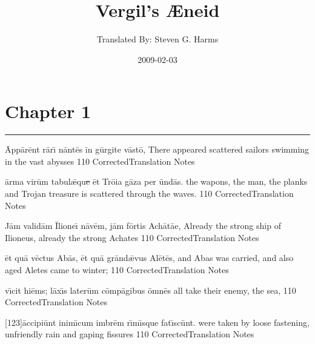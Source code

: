 \documentclass[]{book}
\title{Vergil's {\AE}neid}
\author{ Translated By:  Steven G. Harms }
\date{2009-02-03}
\begin{document}

\ifpdf
{}
\else
{}
\fi

\enumstyle 

\maketitle
\tableofcontents

\chapter{Chapter 1}
%
%
%
%

\newpage

\rule{7cm}{.5mm}

	\latline
	  {\=App\={\macron a}r\=ent r\={\macron a}r\={\macron \i} n\=ant\={\macron e}s \=in g\=urg\-it\-e v\=ast\={\macron o},}
	  { There appeared scattered sailors swimming in the vast abysses }
	  {110}
	  { CorrectedTranslation }
	  { Notes }



	\latline
	  {\=arm\-a v\-ir\=um t\-ab\-ul\={\ae}qu\sout{e }\=et Tr\={\macron o}\-i\-a g\=az\-a p\-er \=und\={\macron a}s.}
	  { the wapons, the man, the planks and Trojan treasure is scattered through the waves. }
	  {110}
	  { CorrectedTranslation }
	  { Notes }


	\latline
	  {J\=am v\-al\-id\=am \={\macron I}lione\={\macron \i} n\={\macron a}v\=em, j\=am f\=ort\-is \-Ach\={\macron a}t\={ae},}
	  { Already the strong ship of Ilioneus, already the strong Achates }
	  {110}
	  { CorrectedTranslation }
	  { Notes }

\newpage

	\latline
	  {\=et qu\={\macron a} v\=ect\-us \-Ab\={\macron a}s, \=et qu\={\macron a} gr\=and\={\ae}v\-us \-Al\={\macron e}t\={\macron e}s,}
	  { and Abas was carried, and also aged Aletes came to winter;  }
	  {110}
	  { CorrectedTranslation }
	  { Notes }



	\latline
	  {v\={\macron \i}c\-it h\-i\=ems; l\=ax\={\macron \i}s l\-at\-er\=um c\=omp\={\macron a}g\-ib\-us \=omn\={\macron e}s}
	  { all  take their enemy, the sea, }
	  {110}
	  { CorrectedTranslation }
	  { Notes }


	\latline
	  {[123]\=acc\-ip\-i\=unt \-in\-im\={\macron \i}c\-um \-imbr\=em r\={\macron \i}m\={\macron \i}squ\-e f\-at\={\macron \i}sc\=unt.}
	  {  were taken by loose fastening, unfriendly rain and gaping fissures }
	  {110}
	  { CorrectedTranslation }
	  { Notes }
\end{document}
